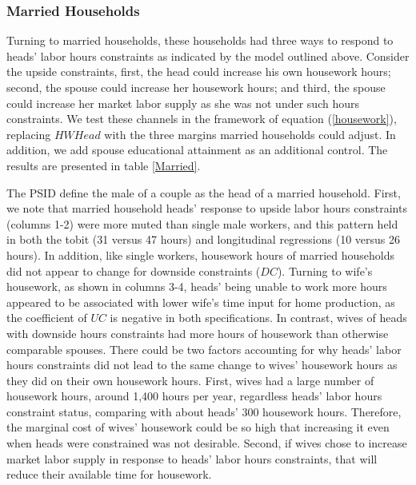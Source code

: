\subsubsection{Married Households}
Turning to married households, these households had three ways to respond to heads' labor hours constraints as indicated by the model outlined above. Consider the upside constraints, first, the head could increase his own housework hours; second, the spouse could increase her housework hours; and third, the spouse could increase her market labor supply as she was not under such hours constraints. We test these channels in the framework of equation (\ref{housework}), replacing $HWHead$ with the three margins married households could adjust. In addition, we add spouse educational attainment as an additional control.  The results are presented in table \ref{Married}. 

The PSID define the male of a couple as the head of a married household. First, we note that married household heads' response to upside labor hours constraints (columns 1-2) were more muted than single male workers, and this pattern held in both the tobit (31 versus 47 hours) and longitudinal regressions (10 versus 26 hours). In addition, like single workers, housework hours of married households did not appear to change for downside constraints ($DC$). Turning to wife's housework, as shown in columns 3-4, heads' being unable to work more hours appeared to be associated with lower wife's time input for home production, as the coefficient of $UC$ is negative in both specifications. In contrast, wives of heads with downside hours constraints had more hours of housework than otherwise comparable spouses. There could be two factors accounting for why heads' labor hours constraints did not lead to the same change to wives' housework hours as they did on their own housework hours.  First, wives had a large number of housework hours, around 1,400 hours per year, regardless heads' labor hours constraint status, comparing with about heads' 300 housework hours.  Therefore, the marginal cost of wives' housework could be so high that increasing it even when heads were constrained was not desirable.  Second, if wives chose to increase market labor supply in response to heads' labor hours constraints, that will reduce their available time for housework.


